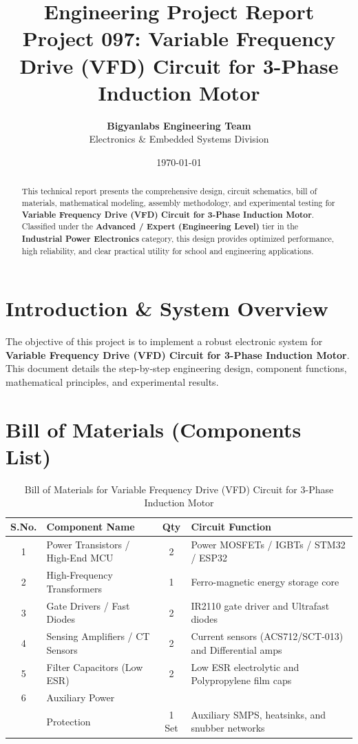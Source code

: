 \documentclass[11pt,a4paper]{article}
\title{\textbf{\Huge Engineering Project Report}\\[0.5em] \Large Project 097: Variable Frequency Drive (VFD) Circuit for 3-Phase Induction Motor}
\author{\textbf{Bigyanlabs Engineering Team}\\ Electronics \& Embedded Systems Division}
\date{\today}
\begin{document}
\maketitle
\thispagestyle{empty}

\begin{abstract}
This technical report presents the comprehensive design, circuit schematics, bill of materials, mathematical modeling, assembly methodology, and experimental testing for \textbf{Variable Frequency Drive (VFD) Circuit for 3-Phase Induction Motor}. Classified under the \textbf{Advanced / Expert (Engineering Level)} tier in the \textbf{Industrial Power Electronics} category, this design provides optimized performance, high reliability, and clear practical utility for school and engineering applications.
\end{abstract}

\newpage
\tableofcontents
\newpage

\section{Introduction \& System Overview}
The objective of this project is to implement a robust electronic system for \textbf{Variable Frequency Drive (VFD) Circuit for 3-Phase Induction Motor}. This document details the step-by-step engineering design, component functions, mathematical principles, and experimental results.

\section{Bill of Materials (Components List)}
\begin{table}[h!]
\centering
\caption{Bill of Materials for Variable Frequency Drive (VFD) Circuit for 3-Phase Induction Motor}
\vspace{0.5em}
\begin{tabular}{clcp{7cm}}
\toprule
\textbf{S.No.} & \textbf{Component Name} & \textbf{Qty} & \textbf{Circuit Function} \\
\midrule
1 & Power Transistors / High-End MCU & 2 & Power MOSFETs / IGBTs / STM32 / ESP32 \\
2 & High-Frequency Transformers & 1 & Ferro-magnetic energy storage core \\
3 & Gate Drivers / Fast Diodes & 2 & IR2110 gate driver and Ultrafast diodes \\
4 & Sensing Amplifiers / CT Sensors & 2 & Current sensors (ACS712/SCT-013) and Differential amps \\
5 & Filter Capacitors (Low ESR) & 2 & Low ESR electrolytic and Polypropylene film caps \\
6 & Auxiliary Power \\& Protection & 1 Set & Auxiliary SMPS, heatsinks, and snubber networks \\
\bottomrule
\end{tabular}
\end{table}
\end{document}
